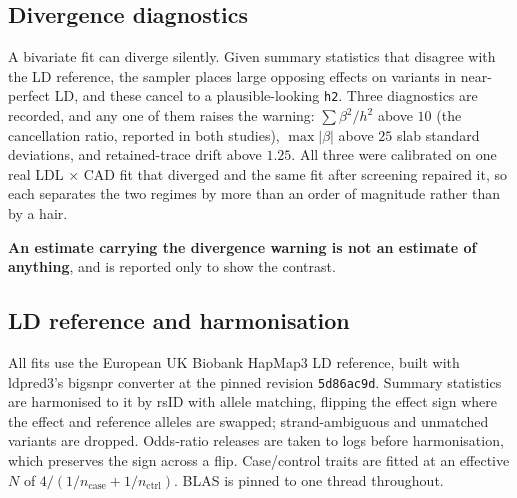 \subsection*{Divergence diagnostics}

A bivariate fit can diverge silently. Given summary statistics that disagree
with the LD reference, the sampler places large opposing effects on variants in
near-perfect LD, and these cancel to a plausible-looking \texttt{h2}. Three
diagnostics are recorded, and any one of them raises the warning:
$\sum \beta^2 / h^2$ above $10$ (the cancellation ratio, reported in both
studies), $\max|\beta|$ above $25$ slab standard deviations, and retained-trace
drift above $1.25$. All three were calibrated on one real LDL $\times$ CAD fit
that diverged and the same fit after screening repaired it, so each separates
the two regimes by more than an order of magnitude rather than by a hair.

\textbf{An estimate carrying the divergence warning is not an estimate of
anything}, and is reported only to show the contrast.

\subsection*{LD reference and harmonisation}

All fits use the European UK Biobank HapMap3 LD reference, built with ldpred3's
bigsnpr converter at the pinned revision \texttt{5d86ac9d}. Summary statistics
are harmonised to it by rsID with allele matching, flipping the effect sign
where the effect and reference alleles are swapped; strand-ambiguous and
unmatched variants are dropped. Odds-ratio releases are taken to logs before
harmonisation, which preserves the sign across a flip. Case/control traits are
fitted at an effective $N$ of $4/(1/n_{\text{case}} + 1/n_{\text{ctrl}})$. BLAS
is pinned to one thread throughout.

